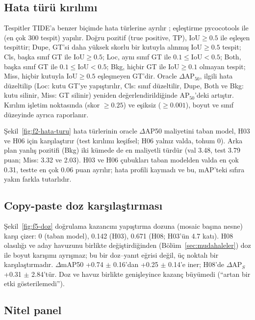 \subsection{Hata türü kırılımı}\label{sec:bulgu-hata}
Tespitler TIDE'a benzer biçimde hata türlerine ayrılır \cite{bolya_2020_tide}; eşleştirme pycocotools ile (en çok 300 tespit) yapılır. Doğru pozitif (true positive, TP), IoU$\ge0.5$ ile eşleşen tespittir; Dupe, GT'si daha yüksek skorlu bir kutuyla alınmış IoU$\ge0.5$ tespit; Cls, başka sınıf GT ile IoU$\ge0.5$; Loc, aynı sınıf GT ile $0.1\le$IoU$<0.5$; Both, başka sınıf GT ile $0.1\le$IoU$<0.5$; Bkg, hiçbir GT ile IoU$\ge0.1$ olmayan tespit; Miss, hiçbir kutuyla IoU$\ge0.5$ eşleşmeyen GT'dir. Oracle $\Delta$AP$_{50}$, ilgili hata düzeltilip (Loc: kutu GT'ye yapıştırılır, Cls: sınıf düzeltilir, Dupe, Both ve Bkg: kutu silinir, Miss: GT silinir) yeniden değerlendirildiğinde AP$_{50}$'deki artıştır. Kırılım işletim noktasında (skor $\ge0.25$) ve eşiksiz ($\ge0.001$), boyut ve sınıf düzeyinde ayrıca raporlanır.



Şekil~\ref{fig:f2-hata-turu} hata türlerinin oracle $\Delta$AP50 maliyetini taban model, H03 ve H06 için karşılaştırır (test kırılımı keşifsel; H06 yalnız valda, tohum 0). Arka plan yanlış pozitifi (Bkg) iki kümede de en maliyetli türdür (val 3.48, test 3.79 puan; Miss: 3.32 ve 2.03). H03 ve H06 çubukları taban modelden valda en çok 0.31, testte en çok 0.06 puan ayrılır; hata profili kaymadı ve bu, mAP'teki sıfıra yakın farkla tutarlıdır.

\subsection{Copy-paste doz karşılaştırması}



Şekil~\ref{fig:f5-doz} doğrulama kazancını yapıştırma dozuna (mosaic başına nesne) karşı çizer: 0 (taban model), 0.142 (H03), 0.671 (H08; H03'ün 4.7 katı). H08 olasılığı ve aday havuzunu birlikte değiştirdiğinden (Bölüm~\ref{sec:mudahaleler}) doz ile boyut karışımı ayrışmaz; bu bir doz--yanıt eğrisi değil, üç noktalı bir karşılaştırmadır. $\Delta$mAP50 +0.74 $\pm$ 0.16'dan +0.25 $\pm$ 0.14'e iner; H08'de $\Delta$AP$_S$ +0.31 $\pm$ 2.84'tür. Doz ve havuz birlikte genişleyince kazanç büyümedi (``artan bir etki gösterilemedi'').

\subsection{Nitel panel}\label{sec:bulgu-nitel}

